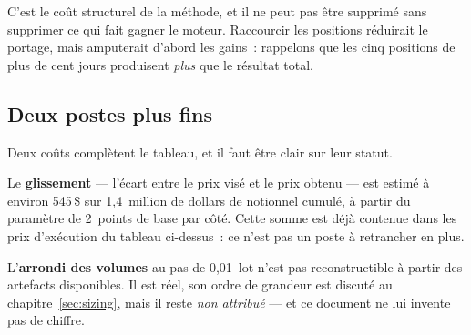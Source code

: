\begin{insightbox}
C'est le coût structurel de la méthode, et il ne peut pas être supprimé sans
supprimer ce qui fait gagner le moteur. Raccourcir les positions réduirait le
portage, mais amputerait d'abord les gains~: rappelons que les cinq positions
de plus de cent jours produisent \emph{plus} que le résultat total.
\end{insightbox}

\subsection{Deux postes plus fins}

Deux coûts complètent le tableau, et il faut être clair sur leur statut.

Le \textbf{glissement} --- l'écart entre le prix visé et le prix obtenu --- est
estimé à environ 545\,\$ sur 1,4~million de dollars de notionnel cumulé, à
partir du paramètre de 2~points de base par côté. Cette somme est déjà contenue
dans les prix d'exécution du tableau ci-dessus~: ce n'est pas un poste à
retrancher en plus.

L'\textbf{arrondi des volumes} au pas de 0,01~lot n'est pas reconstructible à
partir des artefacts disponibles. Il est réel, son ordre de grandeur est discuté
au chapitre~\ref{sec:sizing}, mais il reste \emph{non attribué} --- et ce
document ne lui invente pas de chiffre.
